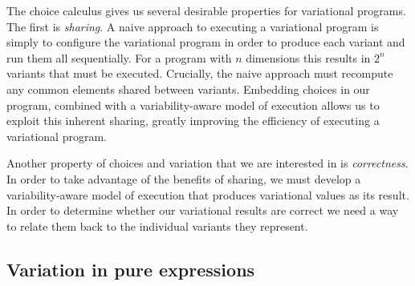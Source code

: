 \documentclass[letterpaper,10pt,onecolumn]{article}
\begin{document}
The choice calculus gives us several desirable properties for variational programs.
The first is \emph{sharing}. A naive approach to executing a variational program is simply to
configure the variational program in order to produce each variant and run them all sequentially.
For a program with $n$ dimensions this results in $2^n$ variants that must be executed. Crucially,
the naive approach must recompute any common elements shared between variants. Embedding
choices in our program, combined with a variability-aware model of execution allows us to exploit this
inherent sharing, greatly improving the efficiency of executing a variational program.

Another property of choices and variation that we are interested in is \emph{correctness}. In order
to take advantage of the benefits of sharing, we must develop a variability-aware model of execution
that produces variational values as its result. In order to determine whether our variational results
are correct we need a way to relate them back to the individual variants they represent.

\subsection{Variation in pure expressions}



\end{document}
